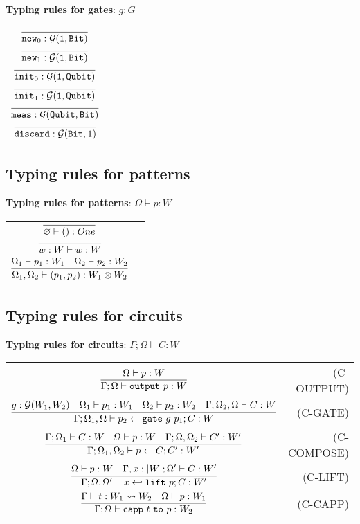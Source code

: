 \documentclass[12pt]{article}
\begin{document}
\noindent \textbf{Typing rules for gates}: $\boxed{g : G}$
\renewcommand\arraystretch{2.5}
\begin{longtable}[c]{cr}
  $ \infer{\new_0 : \calG(\One, \Bit)}{}$ & \\
  $ \infer{\new_1 : \calG(\One, \Bit)}{}$ & \\
  $ \infer{\init_0 : \calG(\One, \Qubit)}{}$ & \\
  $ \infer{\init_1 : \calG(\One, \Qubit)}{}$ & \\
  $ \infer{\meas : \calG(\Qubit, \Bit)}{}$ & \\
  $ \infer{\discard : \calG(\Bit, \One)}{}$ & \\
\end{longtable}

\subsection{Typing rules for patterns}

\noindent \textbf{Typing rules for patterns}: $\boxed{\Omega \vdash p : W}$

\renewcommand\arraystretch{2.5}
\begin{longtable}[c]{cr}
  $ \infer{\varnothing \vdash ():One}{}$ & \\
  $ \infer{w:W \vdash w:W}{}$ & \\
  $ \infer{\Omega_1, \Omega_2 \vdash (p_1,p_2):W_1\otimes W_2}{\Omega_1 \vdash p_1 : W_1  &\Omega_2 \vdash p_2 : W_2} $ & \\
\end{longtable}

\subsection{Typing rules for circuits}

\noindent \textbf{Typing rules for circuits}: $\boxed{\Gamma;\Omega\vdash C:W}$


\renewcommand\arraystretch{3} 
\begin{longtable}[c]{cr}
  $\infer{\Gamma;\Omega\vdash \toutput\ p:W}{\Omega\vdash p : W}$ &(C-OUTPUT)\\
  $\infer{\Gamma;\Omega_1,\Omega\vdash p_2 \from \gate\ g\ p_1 ; C:W}{g:\calG(W_1, W_2) &\Omega_1\vdash p_1:W_1 &\Omega_2\vdash p_2:W_2 &\Gamma ; \Omega_2,\Omega \vdash C:W}$ &(C-GATE)\\
  $\infer{\Gamma;\Omega_1,\Omega_2\vdash p \from C ; C':W'}{\Gamma;\Omega_1\vdash C:W &\Omega \vdash p:W &\Gamma;\Omega,\Omega_2 \vdash C':W'}$ &(C-COMPOSE)\\
  $\infer{\Gamma;\Omega,\Omega'\vdash x \hookleftarrow \lift\ p ; C:W'}{\Omega\vdash p:W &\Gamma,x:|W|;\Omega' \vdash C:W'}$ &(C-LIFT)\\
  $\infer{\Gamma;\Omega\vdash \capp\ t\ \mathtt{to}\ p : W_2}{\Gamma\vdash t:W_1\leadsto W_2 &\Omega\vdash p:W_1}$ &(C-CAPP)\\
  
\end{longtable}
\end{document}
